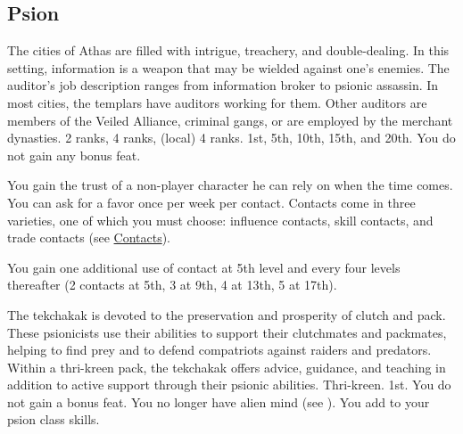 \subsection{Psion}
{The cities of Athas are filled with intrigue, treachery, and double-dealing. In this setting, information is a weapon that may be wielded against one's enemies. The auditor's job description ranges from information broker to psionic assassin. In most cities, the templars have auditors working for them. Other auditors are members of the Veiled Alliance, criminal gangs, or are employed by the merchant dynasties.}
{ 2 ranks,  4 ranks,  (local) 4 ranks.}
{1st, 5th, 10th, 15th, and 20th.}
{You do not gain any bonus feat.}
{
	You gain the trust of a non-player character he can rely on when the time comes. You can ask for a favor once per week per contact. Contacts come in three varieties, one of which you must choose: influence contacts, skill contacts, and trade contacts (see \hyperref[sec:contacts]{Contacts}).

	You gain one additional use of contact at 5th level and every four levels thereafter (2 contacts at 5th, 3 at 9th, 4 at 13th, 5 at 17th).
}

{The tekchakak is devoted to the preservation and prosperity of clutch and pack. These psionicists use their abilities to support their clutchmates and packmates, helping to find prey and to defend compatriots against raiders and predators. Within a
thri-kreen pack, the tekchakak offers advice, guidance, and teaching in addition to active support through their psionic abilities.}
{Thri-kreen.}
{1st.}
{You do not gain a bonus feat.}
{
	You no longer have alien mind (see ). You add  to your psion class skills.
}

